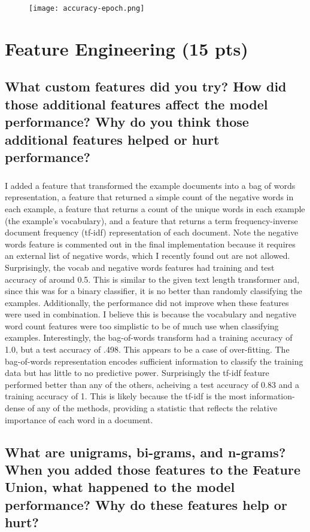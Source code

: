 \documentclass[11pt]{article}
\begin{document}
\begin{figure}[h]
	\texttt{[image: accuracy-epoch.png]}
	\label{fig:graph}
\end{figure}

\section{Feature Engineering (15 pts)}

\subsection{What custom features did you try? How did those additional features affect the model performance? Why do you think those additional features helped or hurt performance?}

\subparagraph{}

I added a feature that transformed the example documents into a bag of words representation, a feature that returned a simple count of the negative words in each example, a feature that returns a count of the unique words in each example (the example's vocabulary), and a feature that returns a term frequency-inverse document frequency (tf-idf) representation of each document. Note the negative words feature is commented out in the final implementation because it requires an external list of negative words, which I recently found out are not allowed. Surprisingly, the vocab and negative words features had training and test accuracy of around 0.5. This is similar to the given text length transformer and, since this was for a binary classifier, it is no better than randomly classifying the examples. Additionally, the performance did not improve when these features were used in combination. I believe this is because the vocabulary and negative word count features were too simplistic to be of much use when classifying examples. Interestingly, the bag-of-words transform had a training accuracy of 1.0, but a test accuracy of .498. This appears to be a case of over-fitting. The bag-of-words representation encodes sufficient information to classify the training data but has little to no predictive power. Surprisingly the tf-idf feature performed better than any of the others, acheiving a test accuracy of 0.83 and a training accuracy of 1. This is likely because the tf-idf is the most information-dense of any of the methods, providing a statistic that reflects the relative importance of each word in a document.

\subsection{What are unigrams, bi-grams, and n-grams? When you added those features to the Feature Union, what happened to the model performance? Why do these features help or hurt?}
\end{document}
